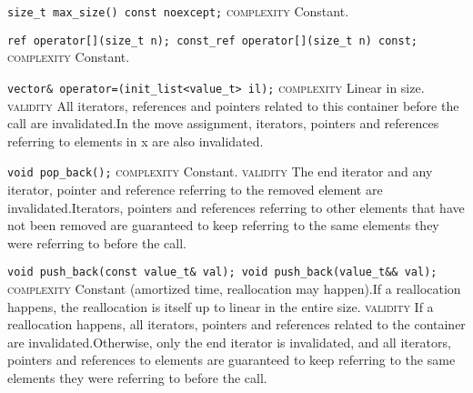 \noindent{}\hspace*{0.25em}\lstinline[basicstyle=\ttfamily\color{cgreen}]{size_t max_size() const noexcept;} \textsc{complexity} Constant.\\\vspace{-0.6em}

\noindent{}\hspace*{0.25em}\lstinline[basicstyle=\ttfamily\color{cgreen}]{ref operator[](size_t n); const_ref operator[](size_t n) const;} \textsc{complexity} Constant.\\\vspace{-0.6em}

\noindent{}\hspace*{0.25em}\lstinline[basicstyle=\ttfamily\color{corange}]{vector& operator=(init_list<value_t> il);} \textsc{complexity} Linear in size. \textsc{validity} All iterators, references and pointers related to this container before the call are invalidated.In the move assignment, iterators, pointers and references referring to elements in x are also invalidated.\\\vspace{-0.6em}

\noindent{}\hspace*{0.25em}\lstinline[basicstyle=\ttfamily\color{cgreen}]{void pop_back();} \textsc{complexity} Constant. \textsc{validity} The end iterator and any iterator, pointer and reference referring to the removed element are invalidated.Iterators, pointers and references referring to other elements that have not been removed are guaranteed to keep referring to the same elements they were referring to before the call.\\\vspace{-0.6em}

\noindent{}\hspace*{0.25em}\lstinline[basicstyle=\ttfamily\color{corange}]{void push_back(const value_t& val); void push_back(value_t&& val);} \textsc{complexity} Constant (amortized time, reallocation may happen).If a reallocation happens, the reallocation is itself up to linear in the entire size. \textsc{validity} If a reallocation happens, all iterators, pointers and references related to the container are invalidated.Otherwise, only the end iterator is invalidated, and all iterators, pointers and references to elements are guaranteed to keep referring to the same elements they were referring to before the call.\\\vspace{-0.6em}

